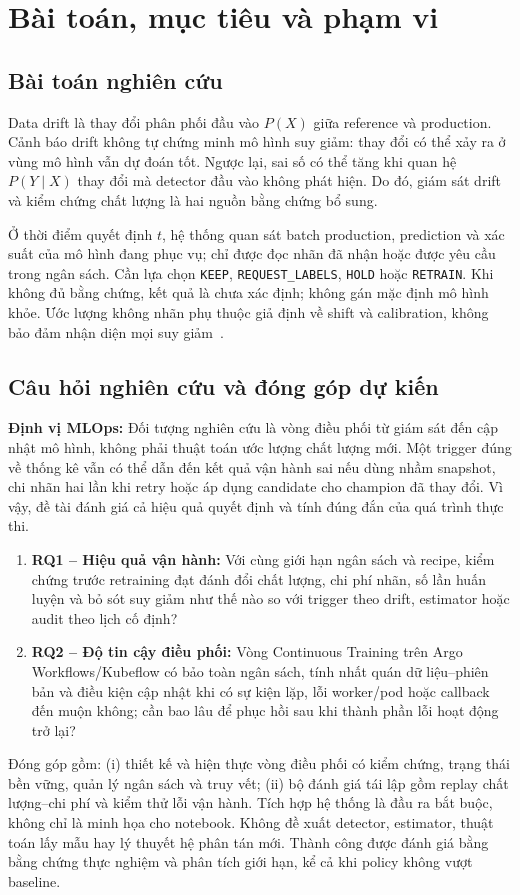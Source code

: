 \section{Bài toán, mục tiêu và phạm vi}
\subsection{Bài toán nghiên cứu}
Data drift là thay đổi phân phối đầu vào $P(X)$ giữa reference và production. Cảnh báo drift không tự chứng minh mô hình suy giảm: thay đổi có thể xảy ra ở vùng mô hình vẫn dự đoán tốt. Ngược lại, sai số có thể tăng khi quan hệ $P(Y\mid X)$ thay đổi mà detector đầu vào không phát hiện. Do đó, giám sát drift và kiểm chứng chất lượng là hai nguồn bằng chứng bổ sung.

Ở thời điểm quyết định $t$, hệ thống quan sát batch production, prediction và xác suất của mô hình đang phục vụ; chỉ được đọc nhãn đã nhận hoặc được yêu cầu trong ngân sách. Cần lựa chọn \texttt{KEEP}, \texttt{REQUEST\_LABELS}, \texttt{HOLD} hoặc \texttt{RETRAIN}. Khi không đủ bằng chứng, kết quả là chưa xác định; không gán mặc định mô hình khỏe. Ước lượng không nhãn phụ thuộc giả định về shift và calibration, không bảo đảm nhận diện mọi suy giảm~\cite{atc,cbpe}.

\subsection{Câu hỏi nghiên cứu và đóng góp dự kiến}
\textbf{Định vị MLOps:} Đối tượng nghiên cứu là vòng điều phối từ giám sát đến cập nhật mô hình, không phải thuật toán ước lượng chất lượng mới. Một trigger đúng về thống kê vẫn có thể dẫn đến kết quả vận hành sai nếu dùng nhầm snapshot, chi nhãn hai lần khi retry hoặc áp dụng candidate cho champion đã thay đổi. Vì vậy, đề tài đánh giá cả hiệu quả quyết định và tính đúng đắn của quá trình thực thi.
\begin{enumerate}
  \item \textbf{RQ1 -- Hiệu quả vận hành:} Với cùng giới hạn ngân sách và recipe, kiểm chứng trước retraining đạt đánh đổi chất lượng, chi phí nhãn, số lần huấn luyện và bỏ sót suy giảm như thế nào so với trigger theo drift, estimator hoặc audit theo lịch cố định?
  \item \textbf{RQ2 -- Độ tin cậy điều phối:} Vòng Continuous Training trên Argo Workflows/Kubeflow có bảo toàn ngân sách, tính nhất quán dữ liệu--phiên bản và điều kiện cập nhật khi có sự kiện lặp, lỗi worker/pod hoặc callback đến muộn không; cần bao lâu để phục hồi sau khi thành phần lỗi hoạt động trở lại?
\end{enumerate}
Đóng góp gồm: (i) thiết kế và hiện thực vòng điều phối có kiểm chứng, trạng thái bền vững, quản lý ngân sách và truy vết; (ii) bộ đánh giá tái lập gồm replay chất lượng--chi phí và kiểm thử lỗi vận hành. Tích hợp hệ thống là đầu ra bắt buộc, không chỉ là minh họa cho notebook. Không đề xuất detector, estimator, thuật toán lấy mẫu hay lý thuyết hệ phân tán mới. Thành công được đánh giá bằng bằng chứng thực nghiệm và phân tích giới hạn, kể cả khi policy không vượt baseline.

